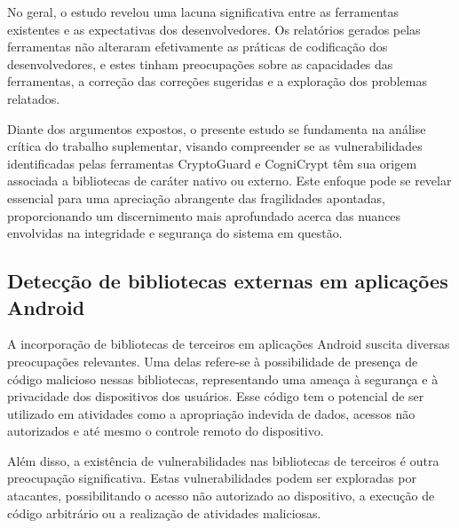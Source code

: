 No geral, o estudo revelou uma lacuna significativa entre as ferramentas existentes e as expectativas dos desenvolvedores. Os relatórios gerados pelas ferramentas não alteraram efetivamente as práticas de codificação dos desenvolvedores, e estes tinham preocupações sobre as capacidades das ferramentas, a correção das correções sugeridas e a exploração dos problemas relatados.



Diante dos argumentos expostos, o presente estudo se fundamenta na análise crítica do trabalho suplementar, visando compreender se as vulnerabilidades identificadas pelas ferramentas CryptoGuard e CogniCrypt têm sua origem associada a bibliotecas de caráter nativo ou externo. Este enfoque pode se revelar essencial para uma apreciação abrangente das fragilidades apontadas, proporcionando um discernimento mais aprofundado acerca das nuances envolvidas na integridade e segurança do sistema em questão.

\subsection{Detecção de bibliotecas externas em aplicações Android} %

A incorporação de bibliotecas de terceiros em aplicações Android suscita diversas preocupações relevantes. Uma delas refere-se à possibilidade de presença de código malicioso nessas bibliotecas, representando uma ameaça à segurança e à privacidade dos dispositivos dos usuários. Esse código tem o potencial de ser utilizado em atividades como a apropriação indevida de dados, acessos não autorizados e até mesmo o controle remoto do dispositivo.

Além disso, a existência de vulnerabilidades nas bibliotecas de terceiros é outra preocupação significativa. Estas vulnerabilidades podem ser exploradas por atacantes, possibilitando o acesso não autorizado ao dispositivo, a execução de código arbitrário ou a realização de atividades maliciosas.

